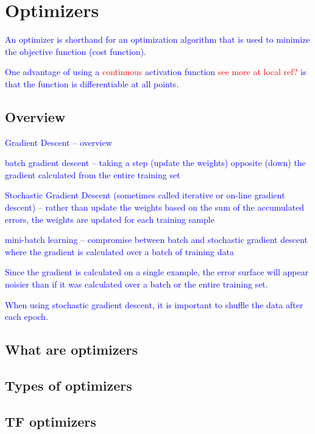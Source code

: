 \section{Optimizers}

\textcolor{blue}{An optimizer is shorthand for an optimization algorithm that is used to minimize the objective function (cost function).}
	
\textcolor{blue}{One advantage of using a \textcolor{red}{continuous} activation function \textcolor{red}{see more at local ref?} is that the function is differentiable at all points. }

\subsection{Overview}

\textcolor{blue}{Gradient Descent -- overview}

\textcolor{blue}{batch gradient descent -- taking a step (update the weights) opposite (down) the gradient calculated from the entire training set}

\textcolor{blue}{Stochastic Gradient Descent (sometimes called iterative or on-line gradient descent) -- rather than update the weights based on the sum of the accumulated errors, the weights are updated for each training sample}

\textcolor{blue}{mini-batch learning -- compromise between batch and stochastic gradient descent where the gradient is calculated over a batch of training data}

\textcolor{blue}{Since the gradient is calculated on a single example, the error surface will appear noisier than if it was calculated over a batch or the entire training set.}

\textcolor{blue}{When using stochastic gradient descent, it is important to shuffle the data after each epoch.}

\subsection{What are optimizers}

\subsection{Types of optimizers}

\subsection{TF optimizers}

